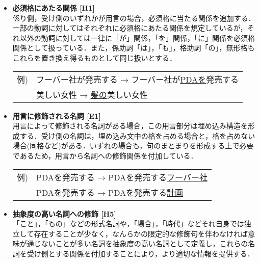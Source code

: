 \begin{itemize}
 \item {\bf 必須格にあたる関係 [H1]} \\
係り側，受け側のいずれかが用言の場合，必須格に当たる関係を追加する．一部の動詞に対してはそれぞれに必須格にあたる関係を規定しているが，それ以外の動詞に対しては一律に「が」関係，「を」関係，「に」関係を必須格関係として扱っている．また，係助詞「は」，「も」，格助詞「の」，無形格もこれらを置き換え得るものとして同じ扱いとする．

\begin{tabular}{ll}
 例) & フーバー社が発売する → フーバー社が\underline{PDAを}発売する \\
 & 美しい女性 → \underline{髪の}美しい女性 \\
\end{tabular}
 \item {\bf 用言に修飾される名詞 [E1]} \\
用言によって修飾される名詞がある場合，この用言部分は埋め込み構造を形成する．受け側の名詞は，埋め込み文中の格を占める場合と，格を占めない場合(同格など)がある．いずれの場合も，句のまとまりを形成する上で必要であるため，用言から名詞への修飾関係を付加している．

\begin{tabular}{ll}
 例) & PDAを発売する → PDAを発売する\underline{フーバー社} \\
 & PDAを発売する → PDAを発売する\underline{計画} \\
\end{tabular}
 \item {\bf 抽象度の高い名詞への修飾 [H5]} \\
「こと」，「もの」などの形式名詞や，「場合」，「時代」などそれ自身では独立して存在することが少なく，なんらかの限定的な修飾句を伴わなければ意味が通じないことが多い名詞を抽象度の高い名詞として定義し，これらの名詞を受け側とする関係を付加することにより，より適切な情報を提供する．


\end{itemize}
